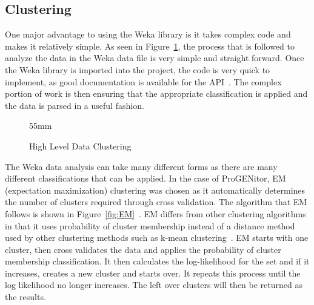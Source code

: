 \subsection{Clustering}
One major advantage to using the Weka library is it takes complex code and makes
it relatively simple.  As seen in Figure~\ref{fig:clustering}, the process that
is followed to analyze the data in the Weka data file is very simple and straight
forward.  Once the Weka library is imported into the project, the code is very
quick to implement, as good documentation is available for the API~\cite{weka}. 
The complex portion of work is then ensuring that the appropriate classification is
applied and the data is parsed in a useful fashion.


\usetikzlibrary{shapes,arrows,chains}

\begin{figure}[H]
	\centering
	\resizebox {!} {55mm} {
}
	\caption{High Level Data Clustering}
	\label{fig:clustering}
\end{figure}

The Weka data analysis can take many different forms as there are many different
classifications that can be applied.  In the case of ProGENitor, EM (expectation
maximization) clustering was chosen as it automatically determines the number of
clusters required through cross validation.  The algorithm that EM follows is
shown in Figure~\ref{fig:EM}~\cite{EM}.  EM differs from other clustering
algorithms in that it uses probability of cluster membership instead of a
distance method used by other clustering methods such as k-mean
clustering~\cite{EM_book}.  EM starts with one cluster, then cross validates the
data and applies the probability of cluster membership classification.  It then calculates the
log-likelihood for the set and if it increases, creates a new cluster and starts
over.  It repeats this process until the log likelihood no longer increases. 
The left over clusters will then be returned as the results.

